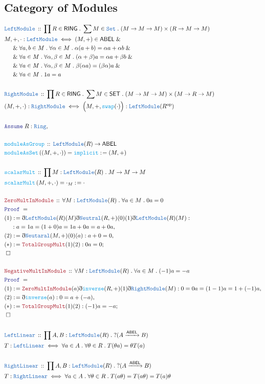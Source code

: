 \documentclass[12pt]{scrartcl}
\newcommand{\TYPE}[1]{\textcolor{NavyBlue}{\mathtt{#1}}}
\newcommand{\FUNC}[1]{\textcolor{Cerulean}{\mathtt{#1}}}
\newcommand{\LOGIC}[1]{\textcolor{Blue}{\mathtt{#1}}}
\newcommand{\THM}[1]{\textcolor{Maroon}{\mathtt{#1}}}
\renewcommand{\.}{\; . \;}
\newcommand{\de}{: \kern 0.1pc =}
\newcommand{\Act}[1]{\left(#1\right)}
\newcommand{\Theorem}[2]{& \THM{#1} \, :: \, #2 \\ & \Proof = \\ }
\newcommand{\DeclareType}[2]{& \TYPE{#1} \, :: \, #2 \\}
\newcommand{\DefineType}[3]{& #1 : \TYPE{#2} \iff #3 \\}
\newcommand{\DeclareFunc}[2]{& \FUNC{#1} \, :: \, #2 \\}
\newcommand{\DefineNamedFunc}[4]{&  \FUNC{#1}\Act{#2} = #3 \de #4 \\}
\newcommand{\NewLine}{\\ & \kern 1pc}
\newcommand{\Page}[1]{ \begin{align*} #1 \end{align*}   }
\newcommand{ \bd }{ \ByDef }
\renewcommand{\And}{\; \& \;}
\newcommand{\Set}{\TYPE{Set}}
\newcommand{\Say}[3]{& #1 \de #2 : #3, \\}
\newcommand{\Conclude}[3]{& #1 \de #2 : #3; \\}
\newcommand{\Assume}[2]{& \LOGIC{Assume} \; #1 : #2, \\}
\newcommand{\QED}{\; \square}
\newcommand{\EndProof}{& \QED \\}
\newcommand{\ByDef}{\eth}
\newcommand{\Proof}{\LOGIC{Proof} \; }
\newcommand{\Arrow}[1]{\xrightarrow{#1}}
\newcommand{\op}{\mathrm{op}}
\newcommand{\SET}{\mathsf{SET}}
\newcommand{\ABEL}{\mathsf{ABEL}}
\newcommand{\Ring}{\TYPE{Ring}}
\newcommand{\RING}{\mathsf{RING}}
\begin{document}
\subsection{Category of Modules}
\Page{
	\DeclareType{LeftModule}{\prod R \in \RING \. \sum M \in \Set \. (M \to M \to M)\times (R \to M \to M)}      
	\DefineType{M,+,\cdot}{LeftModule}{ 
		(M,+) \in \ABEL \And \NewLine \And 
		\forall a,b \in M \. \forall \alpha \in M \. \alpha(a + b) = \alpha a + \alpha b \And \NewLine \And
		\forall a \in M \. \forall \alpha, \beta \in M \. (\alpha + \beta)a = \alpha a + \beta b \And \NewLine \And
		\forall a \in M \. \forall \alpha, \beta \in M \. \beta(\alpha a) = (\beta \alpha)a \And \NewLine \And
		\forall a \in M \.   1a =  a
		}
	\\
	\DeclareType{RightModule}{\prod R \in \RING \. \sum M \in \SET \. (M \to M \to M) \times (M \to R \to M) }
	\DefineType{(M,+,\cdot)}{RightModule}{\Big(M,+,\FUNC{swap}(\cdot)\Big) : \TYPE{LeftModule}(R^\op) } 
	\\
	\Assume{R}{\Ring}
	\\
	\DeclareFunc{moduleAsGroup}{  \TYPE{LeftModule}(R) \to \ABEL }
	\DefineNamedFunc{moduleAsSet}{(M,+,\cdot)}{\FUNC{implicit}}{(M,+)}
	\\
	\DeclareFunc{scalarMult}{\prod M : \TYPE{LeftModule}(R) \. M \to M \to M}
	\DefineNamedFunc{scalarMult}{M,+,\cdot}{\cdot_M}{\cdot}
	\\
	\Theorem{ZeroMultInModule}{\forall M : \TYPE{LeftModule}(R) \. \forall a \in M \. 0a = 0 }
	\Say{(1)}{\bd \TYPE{LeftModule}(R)(M) \bd \TYPE{Neutral}(R,+)(0)(1)\bd \TYPE{LeftModule}(R)(M) }
	{ \NewLine :  a = 1a = (1 + 0)a = 1a + 0a = a + 0a  }
	\Say{(2)}{ \bd \TYPE{Neutaral}(M,+)(0)(a) }{ a + 0 = 0}
	\Conclude{(*)}{\THM{TotalGroupMult}(1)(2)}{0a = 0}
	\EndProof
	\\
	\Theorem{NegativeMultInModule}{\forall M : \TYPE{LeftModule}(R) \. \forall a \in M \. (-1)a = -a}
	\Say{(1)}{\THM{ZeroMultInModule}(a)\bd\FUNC{inverse}(R,+)(1)\bd \TYPE{RightModule}(M) }{0 = 0a = (1 - 1)a = 1 + (-1)a}
	\Say{(2)}{\bd \FUNC{inverse}(a)}{  0 = a + (-a) }
	\Conclude{(*)}{\THM{TotalGroupMult}(1)(2)}{ (-1)a  = -a}
	\EndProof
	\\
	\DeclareType{LeftLinear}{\prod A,B : \TYPE{LeftModule}(R) \. ?(A \Arrow{\ABEL} B)}
	\DefineType{T}{LeftLinear}{ \forall a \in A \. \forall \theta \in R \. T(\theta a) = \theta T(a)    }
	\\
	\DeclareType{RightLinear}{\prod A,B : \TYPE{LeftModule}(R) \. ?(A \Arrow{\ABEL} B)}
	\DefineType{T}{RightLinear}{ \forall a \in A \. \forall \theta \in R \. T( a \theta) =  T(a \theta) = T(a)\theta    }
}
\end{document}
